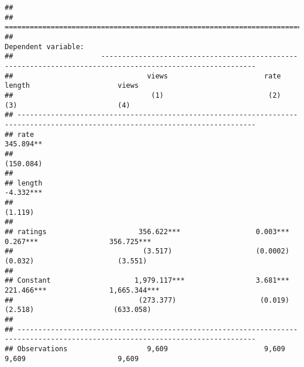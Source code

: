 \documentclass[
]{article}
\begin{document}
\begin{verbatim}
## 
## ===============================================================================================================================
##                                                                 Dependent variable:                                            
##                     -----------------------------------------------------------------------------------------------------------
##                                views                       rate                     length                     views           
##                                 (1)                         (2)                      (3)                        (4)            
## -------------------------------------------------------------------------------------------------------------------------------
## rate                                                                                                         345.894**         
##                                                                                                              (150.084)         
##                                                                                                                                
## length                                                                                                       -4.332***         
##                                                                                                               (1.119)          
##                                                                                                                                
## ratings                      356.622***                  0.003***                  0.267***                 356.725***         
##                               (3.517)                    (0.0002)                  (0.032)                    (3.551)          
##                                                                                                                                
## Constant                    1,979.117***                 3.681***                 221.466***               1,665.344***        
##                              (273.377)                    (0.019)                  (2.518)                   (633.058)         
##                                                                                                                                
## -------------------------------------------------------------------------------------------------------------------------------
## Observations                   9,609                       9,609                    9,609                      9,609           

\end{verbatim}
\end{document}
